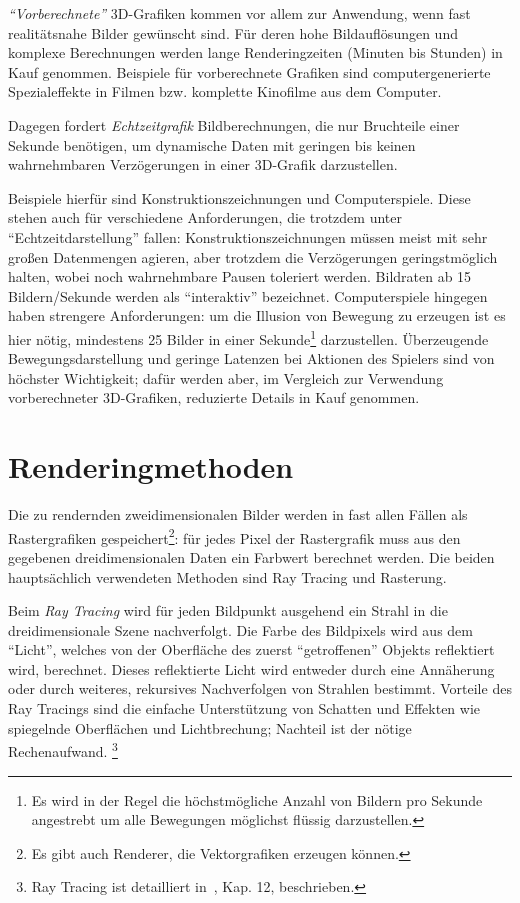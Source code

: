 \documentclass[twoside,a4paper,fleqn,12pt]{book}
\begin{document}
\emph{"`Vorberechnete"'} 3D-Grafiken kommen vor allem zur Anwendung, wenn fast realitätsnahe Bilder gewünscht sind.
Für deren hohe Bildauflösungen und komplexe Berechnungen werden lange Renderingzeiten (Minuten bis Stunden) in Kauf
genommen. Beispiele 
für vorberechnete Grafiken sind computergenerierte Spezialeffekte in Filmen bzw. komplette Kinofilme aus dem Computer.

Dagegen fordert \emph{Echtzeitgrafik} Bildberechnungen, die nur Bruchteile einer Sekunde benötigen, um
dynamische Daten mit geringen bis keinen wahrnehmbaren Verzögerungen in einer 3D-Grafik 
darzustellen.

Beispiele hierfür sind Konstruktionszeichnungen und Computerspiele. Diese stehen auch für verschiedene Anforderungen,
die trotzdem unter "`Echtzeitdarstellung"' fallen: Konstruktionszeichnungen müssen meist mit sehr großen Datenmengen 
agieren, aber trotzdem die Verzögerungen geringstmöglich halten, wobei noch wahrnehmbare Pausen toleriert
werden. Bildraten ab 15 Bildern/Sekunde werden als "`interaktiv"' bezeichnet. %
Computerspiele hingegen haben strengere Anforderungen: um die Illusion von Bewegung zu erzeugen ist es hier nötig,
 mindestens 25 Bilder in einer Sekunde\footnote{Es wird in der Regel die höchstmögliche Anzahl von Bildern pro Sekunde 
angestrebt um alle Bewegungen möglichst flüssig darzustellen.} darzustellen. Überzeugende Bewegungsdarstellung und
geringe Latenzen bei Aktionen des Spielers sind von höchster Wichtigkeit; dafür werden aber, im Vergleich zur
Verwendung vorberechneter 3D-Grafiken, reduzierte Details in Kauf genommen.

\section{Renderingmethoden}

Die zu rendernden zweidimensionalen Bilder werden in fast allen Fällen als Rastergrafiken gespeichert\footnote{Es gibt
auch Renderer, die Vektorgrafiken erzeugen können.}: für jedes Pixel der Rastergrafik muss aus den gegebenen dreidimensionalen
Daten ein Farbwert berechnet werden. Die beiden hauptsächlich verwendeten Methoden sind Ray Tracing und Rasterung.

Beim \emph{Ray Tracing} wird für jeden Bildpunkt ausgehend ein Strahl in die dreidimensionale Szene nachverfolgt. 
Die Farbe des Bildpixels wird aus dem "`Licht"', welches von der Oberfläche des zuerst "`getroffenen"' Objekts reflektiert wird,
berechnet. Dieses reflektierte Licht wird entweder durch eine Annäherung oder durch weiteres, rekursives
Nachverfolgen von Strahlen bestimmt. 
Vorteile des Ray Tracings sind die einfache Unterstützung von Schatten und Effekten wie spiegelnde
Oberflächen und Lichtbrechung; Nachteil ist der nötige Rechenaufwand.
\footnote{Ray Tracing ist detailliert in~\cite{watt_de}, Kap. 12, beschrieben.}
\end{document}
